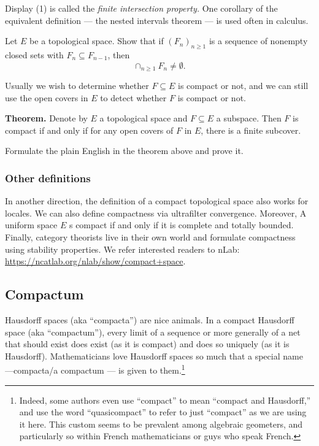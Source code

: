 Display (1) is called the \textit{finite intersection property.}
One corollary  of the equivalent definition --- the nested intervals theorem --- is used often in calculus.

\begin{qst}
   Let $E$ be a topological space. Show that if $(F_n)_{n \ge 1}$ is a sequence of nonempty closed sets with $F_n \subseteq F_{n-1}$,
   then $$ \cap_{n \ge 1} F_n \neq \emptyset. $$
\end{qst}  


Usually we wish to determine whether $F \subseteq E$ is 
compact or not, and
we can still use the open covers in $E$ to detect whether 
$F$ is compact or not.

\medskip
\noindent \textbf{Theorem.} Denote by $E$ a topological space and $F\subseteq E$ a subspace.
Then $F$ is compact if and only if
for any open covers of $F$ in $E$, there is a finite subcover.



\begin{qst}\label{qst:subspace}
  Formulate the plain English in the theorem above and
  prove it.
\end{qst}

\subsubsection{Other definitions}


In another direction, the definition of a compact topological space also works for locales.
We can also define
compactness via ultrafilter convergence.
Moreover, A uniform space 
$E$ s compact if and only if it is complete and totally bounded. 
Finally, 
category theorists live in their own world and formulate
compactness using stability properties.
We refer interested readers to nLab:
\url{https://ncatlab.org/nlab/show/compact+space}.

\subsection{Compactum}


Hausdorff spaces (aka ``compacta'') are nice animals.
In a compact Hausdorff space (aka ``compactum''),
every limit of a sequence or more generally of a net that should exist does exist (as it is compact) and does so uniquely (as it is Hausdorff).
Mathematicians love Hausdorff spaces so much that a special name ---compacta/a compactum --- is given to them.\footnote{Indeed, some authors even use ``compact'' to mean ``compact and Hausdorff,''
and use the word ``quasicompact'' to refer to just ``compact'' as we are using it here. 
This custom seems to be prevalent among algebraic geometers, and particularly so within French mathematicians or guys who speak French.}

